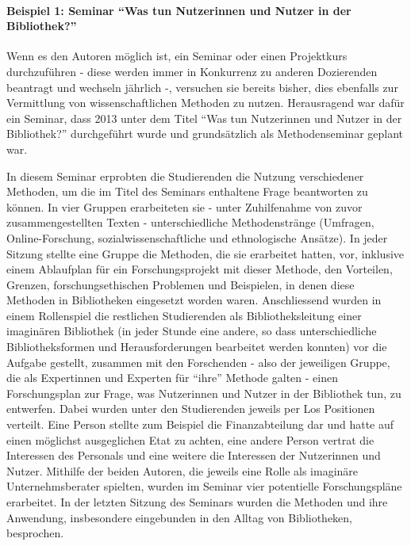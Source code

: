 \documentclass[a4paper,
fontsize=11pt,
oneside,
numbers=noperiodatend,
parskip=half-,
bibliography=totoc,
final
]{scrartcl}
\begin{document}
\paragraph{Beispiel 1: Seminar \enquote{Was tun Nutzerinnen und Nutzer
in der
Bibliothek?}}\label{beispiel-1-seminar-was-tun-nutzerinnen-und-nutzer-in-der-bibliothek}

Wenn es den Autoren möglich ist, ein Seminar oder einen Projektkurs
durchzuführen - diese werden immer in Konkurrenz zu anderen Dozierenden
beantragt und wechseln jährlich -, versuchen sie bereits bisher, dies
ebenfalls zur Vermittlung von wissenschaftlichen Methoden zu nutzen.
Herausragend war dafür ein Seminar, dass 2013 unter dem Titel
\enquote{Was tun Nutzerinnen und Nutzer in der Bibliothek?} durchgeführt
wurde und grundsätzlich als Methodenseminar geplant war.

In diesem Seminar erprobten die Studierenden die Nutzung verschiedener
Methoden, um die im Titel des Seminars enthaltene Frage beantworten zu
können. In vier Gruppen erarbeiteten sie - unter Zuhilfenahme von zuvor
zusammengestellten Texten - unterschiedliche Methodenstränge (Umfragen,
Online-Forschung, sozialwissenschaftliche und ethnologische Ansätze). In
jeder Sitzung stellte eine Gruppe die Methoden, die sie erarbeitet
hatten, vor, inklusive einem Ablaufplan für ein Forschungsprojekt mit
dieser Methode, den Vorteilen, Grenzen, forschungsethischen Problemen
und Beispielen, in denen diese Methoden in Bibliotheken eingesetzt
worden waren. Anschliessend wurden in einem Rollenspiel die restlichen
Studierenden als Bibliotheksleitung einer imaginären Bibliothek (in
jeder Stunde eine andere, so dass unterschiedliche Bibliotheksformen und
Herausforderungen bearbeitet werden konnten) vor die Aufgabe gestellt,
zusammen mit den Forschenden - also der jeweiligen Gruppe, die als
Expertinnen und Experten für \enquote{ihre} Methode galten - einen
Forschungsplan zur Frage, was Nutzerinnen und Nutzer in der Bibliothek
tun, zu entwerfen. Dabei wurden unter den Studierenden jeweils per Los
Positionen verteilt. Eine Person stellte zum Beispiel die
Finanzabteilung dar und hatte auf einen möglichst ausgeglichen Etat zu
achten, eine andere Person vertrat die Interessen des Personals und eine
weitere die Interessen der Nutzerinnen und Nutzer. Mithilfe der beiden
Autoren, die jeweils eine Rolle als imaginäre Unternehmsberater
spielten, wurden im Seminar vier potentielle Forschungspläne erarbeitet.
In der letzten Sitzung des Seminars wurden die Methoden und ihre
Anwendung, insbesondere eingebunden in den Alltag von Bibliotheken,
besprochen.
\end{document}
